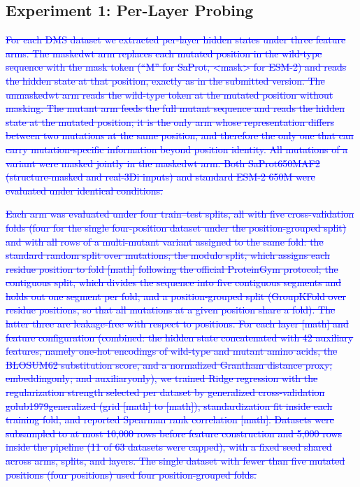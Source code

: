 \documentclass[11pt,a4paper]{article}
\begin{document}
\subsection{Experiment 1: Per-Layer Probing}

\textcolor{blue}{\sout{For each DMS dataset we extracted per-layer hidden states under three feature
arms. The maskedwt arm replaces each mutated position in the wild-type
sequence with the mask token (``M'' for SaProt, <mask> for ESM-2) and reads
the hidden state at that position, exactly as in the submitted version. The
unmaskedwt arm reads the wild-type token at the mutated position without
masking. The mutant arm feeds the full mutant sequence and reads the hidden
state at the mutated position; it is the only arm whose representation differs between
two mutations at the same position, and therefore the only one that can carry
mutation-specific information beyond position identity. All mutations of a variant
were masked jointly in the maskedwt arm. Both SaProt650MAF2 (structure-masked
and real-3Di inputs) and standard ESM-2 650M were evaluated under identical conditions.}}

\textcolor{blue}{\sout{Each arm was evaluated under four train--test splits, all with five
cross-validation folds (four for the single four-position dataset under the
position-grouped split) and with all rows of a multi-mutant variant assigned to the
same fold: the standard random split over mutations; the modulo
split, which assigns each residue position to fold [math]
following the official ProteinGym protocol; the contiguous split, which
divides the sequence into five contiguous segments and holds out one segment per
fold; and a position-grouped split (GroupKFold over residue positions, so
that all mutations at a given position share a fold). The latter three are
leakage-free with respect to positions. For each layer [math] and
feature configuration (combined: the hidden state concatenated with 42 auxiliary
features, namely one-hot encodings of wild-type and mutant amino acids, the BLOSUM62
substitution score, and a normalized Grantham distance proxy; embeddingonly; and
auxiliaryonly), we trained Ridge regression with the regularization strength
selected per dataset by generalized cross-validation golub1979generalized
(grid [math] to [math]), standardization fit inside each training fold, and
reported Spearman rank correlation [math]. Datasets were subsampled to at most 10,000
rows before feature construction and 5,000 rows inside the pipeline (11 of 63 datasets
were capped), with a fixed seed shared across arms, splits, and layers. The single
dataset with fewer than five mutated positions (four positions) used four
position-grouped folds.}}
\end{document}
